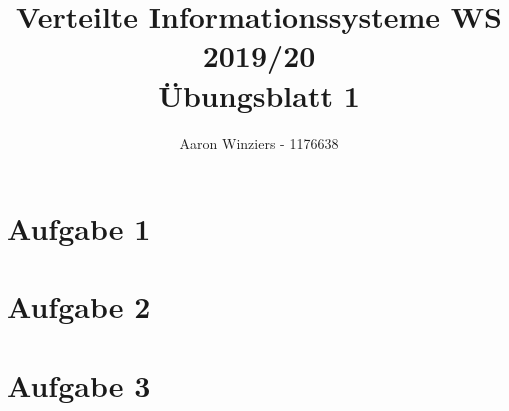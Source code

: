 \documentclass[11pt,a4paper,parskip=half ]{scrartcl}
\author{Aaron Winziers - 1176638}
\title{Verteilte Informationssysteme WS 2019/20\\\LARGE{Übungsblatt 1}}
\begin{document}
	\maketitle
	
	\section*{Aufgabe 1}
	
	\section*{Aufgabe 2}
	
	\section*{Aufgabe 3}
	
\end{document}
